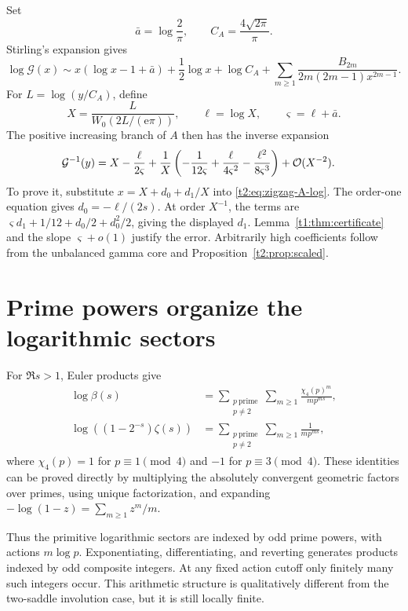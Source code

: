 \documentclass[11pt,openany]{book}
\numberwithin{equation}{chapter}
\theoremstyle{plain}
\theoremstyle{definition}
\theoremstyle{remark}
\newcommand{\ee}{\mathrm e}
\begin{document}
Set
\[
 \bar a=\log\frac2\pi,\qquad C_A=\frac{4\sqrt{2\pi}}\pi.
\]
Stirling's expansion gives
\begin{equation}
 \log \mathcal G(x)\sim x(\log x-1+\bar a)+\frac12\log x+\log C_A
       +\sum_{m\ge1}\frac{B_{2m}}{2m(2m-1)x^{2m-1}}.
 \label{t2:eq:zigzag-A-log}
\end{equation}
For $L=\log(y/C_A)$, define
\begin{equation}
 X=\frac{L}{W_0(2L/(\ee\pi))},\qquad
 \ell=\log X,\qquad \varsigma=\ell+\bar a.
 \label{t2:eq:zigzag-core}
\end{equation}
The positive increasing branch of $A$ then has the inverse expansion
\begin{align}
 \mathcal G^{-1}(y)={}&X-\frac\ell{2\varsigma}
 +\frac1X\left(-\frac1{12\varsigma}+\frac\ell{4\varsigma^2}
                         -\frac{\ell^2}{8\varsigma^3}\right)
 +\mathcal O(X^{-2}).
 \label{t2:eq:zigzag-A-inverse}
\end{align}
To prove it, substitute $x=X+d_0+d_1/X$ into \eqref{t2:eq:zigzag-A-log}. The order-one equation gives $d_0=-\ell/(2s)$. At order $X^{-1}$, the terms are $\varsigma d_1+1/12+d_0/2+d_0^2/2$, giving the displayed $d_1$. Lemma~\ref{t1:thm:certificate} and the slope $\varsigma+o(1)$ justify the error. Arbitrarily high coefficients follow from the unbalanced gamma core and Proposition~\ref{t2:prop:scaled}.

\section{Prime powers organize the logarithmic sectors}

For $\Re s>1$, Euler products give
\begin{align}
 \log\beta(s)&=\sum_{\substack{p\ \mathrm{prime}\\p\ne2}}
               \sum_{m\ge1}\frac{\chi_4(p)^m}{m p^{ms}},\nonumber\\
 \log((1-2^{-s})\zeta(s))&=
             \sum_{\substack{p\ \mathrm{prime}\\p\ne2}}
               \sum_{m\ge1}\frac1{m p^{ms}},
 \label{t2:eq:zigzag-primes}
\end{align}
where $\chi_4(p)=1$ for $p\equiv1\pmod4$ and $-1$ for $p\equiv3\pmod4$. These identities can be proved directly by multiplying the absolutely convergent geometric factors over primes, using unique factorization, and expanding $-\log(1-z)=\sum_{m\ge1}z^m/m$.

Thus the primitive logarithmic sectors are indexed by odd prime powers, with actions $m\log p$. Exponentiating, differentiating, and reverting generates products indexed by odd composite integers. At any fixed action cutoff only finitely many such integers occur. This arithmetic structure is qualitatively different from the two-saddle involution case, but it is still locally finite.
\end{document}
